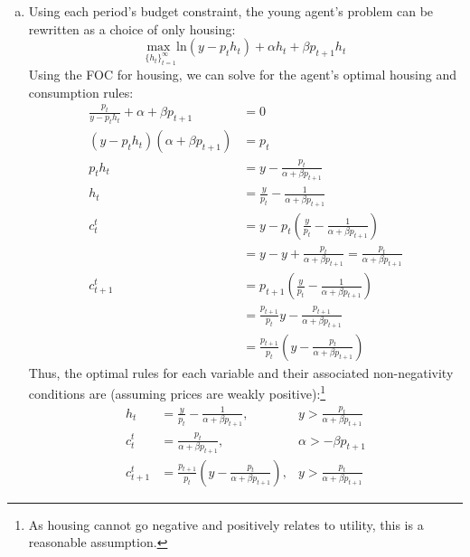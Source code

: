 \documentclass{article}
\newcommand{\loge}[1]{\text{ln}\left(#1\right)}
\newcommand{\usmax}[1]{\underset{#1}{\text{max }}}
\begin{document}
\begin{enumerate}
\begin{enumerate}[(a)]
			\item Using each period's budget constraint, the young agent's problem can be rewritten as a choice of only housing:
				\[
					\usmax{\{h_t\}^\infty_{t=1}}\loge{y-p_th_t} + \alpha h_t + \beta p_{t+1}h_t
				\]
				Using the FOC for housing, we can solve for the agent's optimal housing and consumption rules:
				\begin{align*}
					\frac{p_t}{y-p_th_t} + \alpha + \beta p_{t+1} &= 0				\\
					(y-p_th_t)(\alpha + \beta p_{t+1}) &= p_t 						\\
					p_th_t &= y-\frac{p_t}{\alpha + \beta p_{t+1}}					\\
					h_t		&= \frac{y}{p_t} - \frac{1}{\alpha + \beta p_{t+1}} 	\\
					c_t^t &= y-p_t\left(\frac{y}{p_t} - \frac{1}{\alpha + \beta p_{t+1}}\right) \\
						&= y - y + \frac{p_t}{\alpha + \beta p_{t+1}} = \frac{p_t}{\alpha + \beta p_{t+1}} \\
					c_{t+1}^t &= p_{t+1}\left(\frac{y}{p_t} - \frac{1}{\alpha + \beta p_{t+1}}\right) \\
						&= \frac{p_{t+1}}{p_t} y - \frac{p_{t+1}}{\alpha + \beta p_{t+1}}	\\
						&=  \frac{p_{t+1}}{p_t} \left( y - \frac{p_t}{\alpha + \beta p_{t+1}} \right)
				\end{align*}
				Thus, the optimal rules for each variable and their associated non-negativity conditions are (assuming prices are weakly positive):\footnote{As housing cannot go negative and positively relates to utility, this is a reasonable assumption.}
				\begin{align*}
					h_t		&= \frac{y}{p_t} - \frac{1}{\alpha + \beta p_{t+1}}, &y>\frac{p_t}{\alpha + \beta p_{t+1}} 	\\
					c_t^t &= \frac{p_t}{\alpha + \beta p_{t+1}}, &\alpha>-\beta p_{t+1} \\
					c_{t+1}^t &=  \frac{p_{t+1}}{p_t} \left( y - \frac{p_t}{\alpha + \beta p_{t+1}} \right), &y>\frac{p_t}{\alpha + \beta p_{t+1}}
				\end{align*}
				

\end{enumerate}
\end{enumerate}
\end{document}
